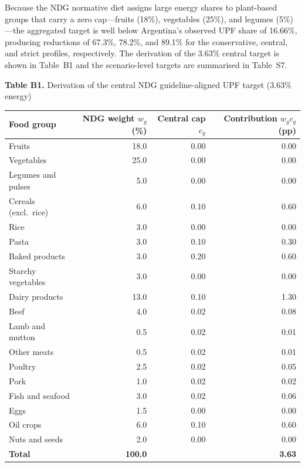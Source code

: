 ﻿\documentclass{article}
\begin{document}
Because the NDG normative diet assigns large energy shares to plant-based groups that carry a zero cap---fruits (18\%), vegetables (25\%), and legumes (5\%)---the aggregated target is well below Argentina's observed UPF share of 16.66\%, producing reductions of 67.3\%, 78.2\%, and 89.1\% for the conservative, central, and strict profiles, respectively. The derivation of the 3.63\% central target is shown in Table~B1 and the scenario-level targets are summarised in Table~S7.

\vspace{0.5em}
\noindent\textbf{Table B1.} Derivation of the central NDG guideline-aligned UPF target (3.63\% energy)

\smallskip
\begin{center}
\small
\begin{tabular}{lrrr}
\toprule
\textbf{Food group} & \textbf{NDG weight $w_g$ (\%)} & \textbf{Central cap $c_g$} & \textbf{Contribution $w_g c_g$ (pp)} \\
\midrule
Fruits & 18.0 & 0.00 & 0.00 \\
Vegetables & 25.0 & 0.00 & 0.00 \\
Legumes and pulses & 5.0 & 0.00 & 0.00 \\
Cereals (excl.\ rice) & 6.0 & 0.10 & 0.60 \\
Rice & 3.0 & 0.00 & 0.00 \\
Pasta & 3.0 & 0.10 & 0.30 \\
Baked products & 3.0 & 0.20 & 0.60 \\
Starchy vegetables & 3.0 & 0.00 & 0.00 \\
Dairy products & 13.0 & 0.10 & 1.30 \\
Beef & 4.0 & 0.02 & 0.08 \\
Lamb and mutton & 0.5 & 0.02 & 0.01 \\
Other meats & 0.5 & 0.02 & 0.01 \\
Poultry & 2.5 & 0.02 & 0.05 \\
Pork & 1.0 & 0.02 & 0.02 \\
Fish and seafood & 3.0 & 0.02 & 0.06 \\
Eggs & 1.5 & 0.00 & 0.00 \\
Oil crops & 6.0 & 0.10 & 0.60 \\
Nuts and seeds & 2.0 & 0.00 & 0.00 \\
\midrule
\textbf{Total} & \textbf{100.0} & & \textbf{3.63} \\
\bottomrule
\end{tabular}
\end{center}
\end{document}
